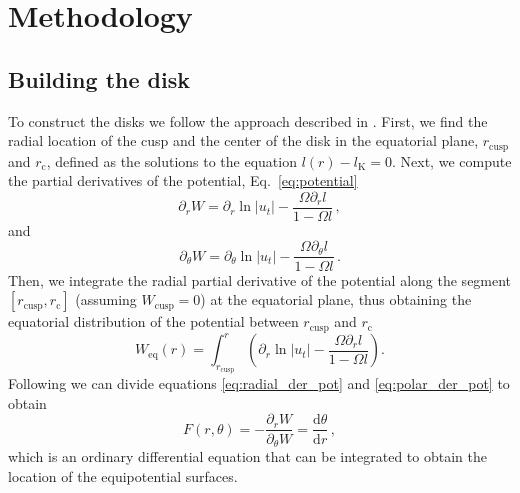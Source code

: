 \documentclass{aa}
\begin{document}
\section{Methodology}

\subsection{Building the disk}

To construct the disks we follow the approach described in \citet{Qian:2009}. First, we find the radial location of the cusp and the center of the disk in the equatorial plane, $r_{\mathrm{cusp}}$ and $r_{\mathrm{c}}$, defined as the solutions to the equation $l(r) - l_{\mathrm{K}} = 0$.
Next, we compute the partial derivatives of the potential, Eq.~\eqref{eq:potential}
\begin{equation}\label{eq:radial_der_pot}
\partial_r W = \partial_r \ln|u_t| - \frac{\Omega \partial_rl}{1 - \Omega l}\,,
\end{equation}
and
\begin{equation}\label{eq:polar_der_pot}
\partial_{\theta} W = \partial_{\theta} \ln|u_t| - \frac{\Omega \partial_{\theta}l}{1 - \Omega l}\,.
\end{equation}
Then, we integrate the radial partial derivative of the potential along the segment $[r_{\mathrm{cusp}}, r_{\mathrm{c}}]$ (assuming $W_{\mathrm{cusp}} = 0$) at the equatorial plane, thus obtaining the equatorial distribution of the potential between $r_{\mathrm{cusp}}$ and $r_{\mathrm{c}}$
\begin{equation}\label{eq:equatorial_pot}
W_{\mathrm{eq}}(r) = \int^{r}_{r_{\mathrm{cusp}}}\left(\partial_r \ln|u_t| - \frac{\Omega \partial_rl}{1 - \Omega l}\right).
\end{equation}
Following \citet{Qian:2009} we can divide equations \eqref{eq:radial_der_pot} and \eqref{eq:polar_der_pot} to obtain
\begin{equation}\label{eq:F}
F(r, \theta) = -\frac{\partial_r W}{\partial_{\theta} W} = \frac{\mathrm{d}\theta}{\mathrm{d}r}\,,
\end{equation}
which is an ordinary differential equation that can be integrated to obtain the location of the equipotential surfaces.
\end{document}
